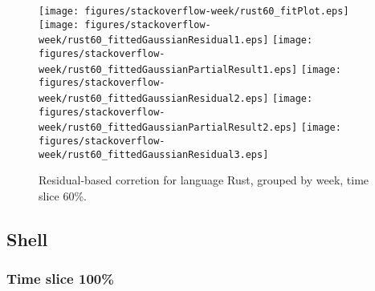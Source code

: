 \begin{figure}[t]
\centering
{}
{\texttt{[image: figures/stackoverflow-week/rust60\_fitPlot.eps]}}
{\texttt{[image: figures/stackoverflow-week/rust60\_fittedGaussianResidual1.eps]}}
{\texttt{[image: figures/stackoverflow-week/rust60\_fittedGaussianPartialResult1.eps]}}
{\texttt{[image: figures/stackoverflow-week/rust60\_fittedGaussianResidual2.eps]}}
{\texttt{[image: figures/stackoverflow-week/rust60\_fittedGaussianPartialResult2.eps]}}
{\texttt{[image: figures/stackoverflow-week/rust60\_fittedGaussianResidual3.eps]}}
\caption{Residual-based corretion for language Rust, grouped by week, time slice 60\%.}
\end{figure}


\FloatBarrier


\subsection{Shell}

\subsubsection{Time slice 100\%}

